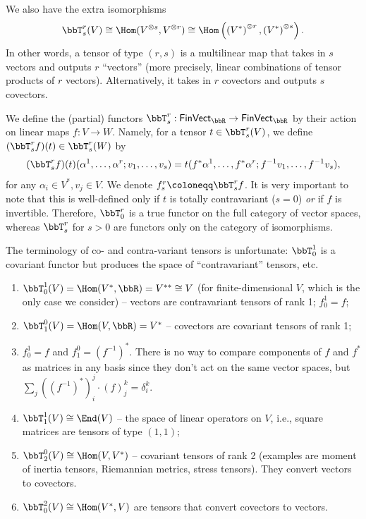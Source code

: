 We also have the extra isomorphisms
\[
\bbT^r_s(V)\cong \Hom(V^{\otimes s},V^{\otimes r})\cong \Hom\left(\left(V^\ast\right)^{\otimes r},\left(V^\ast\right)^{\otimes s}\right).
\]
In other words, a tensor of type $(r,s)$ is a multilinear map that takes in $s$ vectors and outputs $r$ ``vectors'' (more precisely, linear combinations of tensor products of $r$ vectors). Alternatively, it takes in $r$ covectors and outputs $s$ covectors.

\begin{defn}
    We define the (partial) functors $\bbT^r_s:\mathsf{FinVect_\bbR }\to\mathsf{FinVect}_\bbR $ by their action on linear maps $f:V\to W$. Namely, for a tensor $t\in \bbT^r_s(V)$, we define $(\bbT^r_sf)(t)\in \bbT^r_s(W)$ by
    \[
    (\bbT^r_sf)(t)(\alpha^1,\ldots,\alpha^r;v_1,\ldots,v_s)=t(f^\ast\alpha^1,\ldots,f^\ast\alpha^r;f^{-1}v_1,\ldots,f^{-1}v_s),
    \]
    for any $\alpha_i\in V^\ast,v_j\in V$. We denote $f^r_s\coloneqq \bbT^r_s f$. It is very important to note that this is well-defined only if $t$ is totally contravariant ($s=0$) \emph{or} if $f$ is invertible. Therefore, $\bbT^r_0$ is a true functor on the full category of vector spaces, whereas $\bbT^r_s$ for $s>0$ are functors only on the category of isomorphisms.
\end{defn}

\begin{rem}
    The terminology of co- and contra-variant tensors is unfortunate: $\bbT_0^1$ is a covariant functor but produces the space of ``contravariant'' tensors, etc.
\end{rem}

\begin{example}
\begin{enumerate}
    \item $\bbT_0^1(V)=\Hom(V^\ast,\bbR )=V^{\ast\ast}\cong V$ (for finite-dimensional $V$, which is the only case we consider) -- vectors are contravariant tensors of rank 1; $f^1_0=f$;
    \item $\bbT_1^0(V)=\Hom(V,\bbR )=V^\ast$ -- covectors are covariant tensors of rank 1;
    \item $f^1_0=f$ and $f^0_1=\left(f^{-1}\right)^\ast$. There is no way to compare components of $f$ and $f^\ast$ as matrices in any basis since they don't act on the same vector spaces, but $\sum_j \left(\left(f^{-1}\right)^\ast\right)_i^j \cdot (f)_j^k=\delta_i^k$.
    \item $\bbT^1_1(V)\cong \End(V)$ -- the space of linear operators on $V$, i.e., square matrices are tensors of type $(1,1)$;
    \item $\bbT^0_2(V)\cong\Hom(V,V^\ast)$ -- covariant tensors of rank 2 (examples are moment of inertia tensors, Riemannian metrics, stress tensors). They convert vectors to covectors.
    \item $\bbT^2_0(V)\cong\Hom(V^\ast ,V)$ are tensors that convert covectors to vectors.
\end{enumerate}
\end{example}

